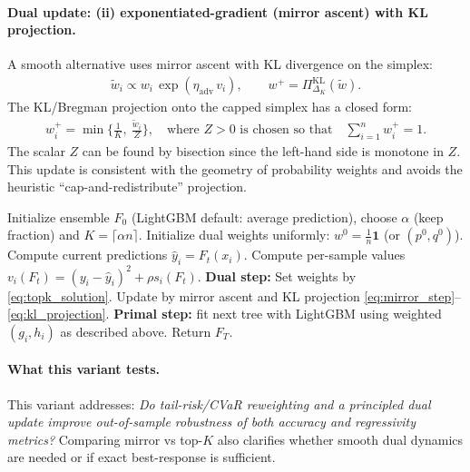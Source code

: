 \documentclass[11pt]{article}
\theoremstyle{plain}
\theoremstyle{definition}
\newcommand{\1}{\mathbf{1}}
\begin{document}
\paragraph{Dual update: (ii) exponentiated-gradient (mirror ascent) with KL projection.}
A smooth alternative uses mirror ascent with KL divergence on the simplex:
\begin{align}
 \tilde w_i \propto w_i\,\exp(\eta_{\text{adv}}\, v_i),
\qquad
 w^{+} = \Pi_{\Delta_K}^{\mathrm{KL}}(\tilde w).
\label{eq:mirror_step}
\end{align}
The KL/Bregman projection onto the capped simplex has a closed form:
\begin{align}
 w_i^{+} = \min\Big\{\tfrac{1}{K},\ \tfrac{\tilde w_i}{Z}\Big\},
\quad \text{where $Z>0$ is chosen so that}\quad \sum_{i=1}^n w_i^{+}=1.
\label{eq:kl_projection}
\end{align}
The scalar $Z$ can be found by bisection since the left-hand side is monotone in $Z$. This update is consistent with the geometry of probability weights and avoids the heuristic ``cap-and-redistribute'' projection.

\begin{algorithm}[t]
\caption{Improved primal--dual robust boosting (conceptual)}
\label{alg:pd_improved}
\begin{algorithmic}[1]
\State Initialize ensemble $F_0$ (LightGBM default: average prediction), choose $\alpha$ (keep fraction) and $K=\lceil\alpha n\rceil$.
\State Initialize dual weights uniformly: $w^0=\tfrac{1}{n}\mathbf{1}$ (or $(p^0,q^0)$).
  \State Compute current predictions $\hat y_i = F_t(x_i)$.
  \State Compute per-sample values $v_i(F_t)=(y_i-\hat y_i)^2 + \rho s_i(F_t)$.
  \State \textbf{Dual step:}
      \State Set weights by \eqref{eq:topk_solution}.
    \Else
      \State Update by mirror ascent and KL projection \eqref{eq:mirror_step}--\eqref{eq:kl_projection}.
    \EndIf
  \State \textbf{Primal step:} fit next tree with LightGBM using weighted $(g_i,h_i)$ as described above.
\EndFor
\State Return $F_T$.
\end{algorithmic}
\end{algorithm}

\paragraph{What this variant tests.}
This variant addresses: \emph{Do tail-risk/CVaR reweighting and a principled dual update improve out-of-sample robustness of both accuracy and regressivity metrics?} Comparing mirror vs top-$K$ also clarifies whether smooth dual dynamics are needed or if exact best-response is sufficient.
\end{document}
